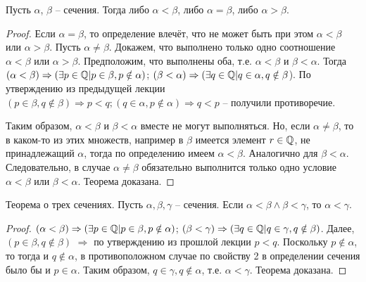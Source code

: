 \documentclass[main]{subfiles}
\begin{document}
\begin{theorem}
    Пусть $\alpha$, $\beta$ -- сечения. Тогда либо $\alpha < \beta$, либо
    $\alpha = \beta$, либо $\alpha > \beta$.
\end{theorem}
\begin{proof}
    Если $\alpha = \beta$, то определение влечёт, что не может быть при этом
    $\alpha < \beta$ или $\alpha > \beta$. Пусть $\alpha \neq \beta$. Докажем,
    что выполнено только одно соотношение $\alpha < \beta$ или $\alpha > \beta$.
    Предположим, что выполнены оба, т.е. $\alpha < \beta$ и $\beta < \alpha$.
    Тогда $(\alpha < \beta) \Rightarrow (\exists p \in \mathbb{Q} | 
    p \in \beta, p \notin \alpha)$; $(\beta < \alpha) \Rightarrow 
    (\exists q \in \mathbb{Q} | q \in \alpha, q \notin \beta$). 
    По утверждению из предыдущей лекции $(p \in \beta, q \notin \beta) \Rightarrow
    p < q; (q \in \alpha, p \notin \alpha) \Rightarrow q < p$ -- получили
    противоречие.

    Таким образом, $\alpha < \beta$ и $\beta < \alpha$ вместе не могут выполняться.
    Но, если $\alpha \neq \beta$, то в каком-то из этих множеств, например в 
    $\beta$ имеется элемент $r \in \mathbb{Q}$, не принадлежащий $\alpha$,
    тогда по определению имеем $\alpha < \beta$. Аналогично для $\beta < \alpha$.
    Следовательно, в случае $\alpha \neq \beta$ обязательно выполнится только
    одно условие $\alpha < \beta$ или $\beta < \alpha$. Теорема доказана.
\end{proof}

\begin{theorem}
    Теорема о трех сечениях. Пусть $\alpha, \beta, \gamma$ -- сечения. 
    Если $\alpha < \beta \wedge \beta < \gamma$, то $\alpha < \gamma$.
\end{theorem}
\begin{proof}
$(\alpha < \beta) \Rightarrow (\exists p \in \mathbb{Q} | p \in \beta, p \notin \alpha)$;
$(\beta < \gamma) \Rightarrow (\exists q \in \mathbb{Q} | q \in \gamma, q \notin \beta)$.
Далее, $(p \in \beta, q \notin \beta)$ $\Rightarrow$ по утверждению из прошлой лекции
$p < q$. Поскольку $p \notin \alpha$, то тогда и $q \notin \alpha$, 
в противоположном случае по свойству 2 в определении сечения было бы и $p \in \alpha$.
Таким образом, $q \in \gamma, q \notin \alpha$, т.е. $\alpha < \gamma$.
Теорема доказана.    
\end{proof}
\end{document}
